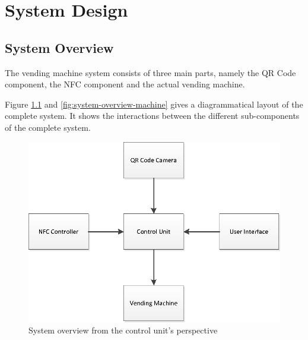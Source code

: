 \chapter{System Design}

\section{System Overview}

The vending machine system consists of three main parts, namely the QR Code component, the NFC
component and the actual vending machine. 

Figure \ref{fig:system-overview-pi} and \ref{fig:system-overview-machine} gives a
diagrammatical layout of the complete system.
It shows the interactions between the different sub-components of the complete system.

\begin{figure}[h]
\centering
\includegraphics[scale=0.7]{pi_system_overview.eps}
\caption{System overview from the control unit's perspective}
\label{fig:system-overview-pi}
\end{figure}

